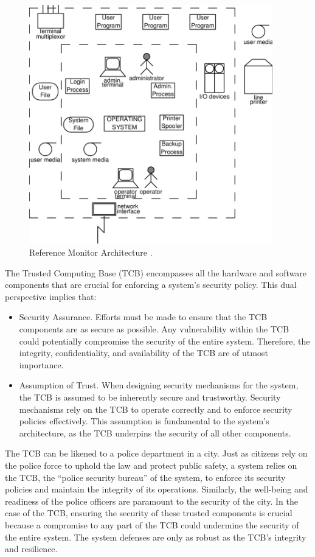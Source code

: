 \begin{figure}[htbp]
	\centering
	\includegraphics[width=300pt]{chapters/part-4/figures/system_boundary.png}
	\caption{Reference Monitor Architecture \cite{gasser1988building}.} \label{ch:ossec:fig:system_boundary}
\end{figure}

The Trusted Computing Base (TCB) encompasses all the hardware and software components that are crucial for enforcing a system's security policy. This dual perspective implies that:

\begin{itemize}
	\item Security Assurance. Efforts must be made to ensure that the TCB components are as secure as possible. Any vulnerability within the TCB could potentially compromise the security of the entire system. Therefore, the integrity, confidentiality, and availability of the TCB are of utmost importance.
	\item Assumption of Trust. When designing security mechanisms for the system, the TCB is assumed to be inherently secure and trustworthy. Security mechanisms rely on the TCB to operate correctly and to enforce security policies effectively. This assumption is fundamental to the system's architecture, as the TCB underpins the security of all other components.
\end{itemize}

The TCB can be likened to a police department in a city. Just as citizens rely on the police force to uphold the law and protect public safety, a system relies on the TCB, the ``police security bureau'' of the system, to enforce its security policies and maintain the integrity of its operations. Similarly, the well-being and readiness of the police officers are paramount to the security of the city. In the case of the TCB, ensuring the security of these trusted components is crucial because a compromise to any part of the TCB could undermine the security of the entire system. The system defenses are only as robust as the TCB's integrity and resilience.

